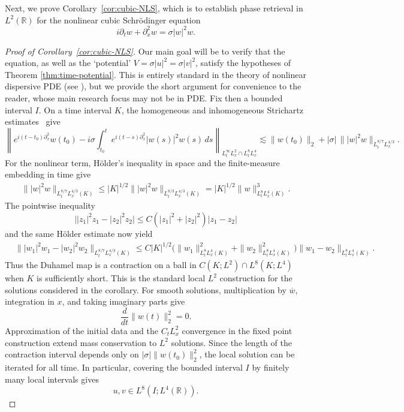 \documentclass[11pt]{amsart}
\theoremstyle{remark}
\newcommand{\R}{\mathbb R}
\newcommand{\1}{\mathbf 1}
\begin{document}
Next, we prove Corollary~\ref{cor:cubic-NLS}, which is to establish phase retrieval in $L^2(\mathbb{R})$ for the nonlinear cubic Schr\"odinger equation 
\[
 i\partial_t w+\partial_x^2w=\sigma|w|^2w.
 \tag{2.1}\label{eq:cubic-NLS}
\]
\begin{proof}[Proof of Corollary~\ref{cor:cubic-NLS}]
Our main goal will be to verify that the equation, as well as the `potential' $V = \sigma|u|^2 = \sigma|v|^2$, satisfy the hypotheses of Theorem \ref{thm:time-potential}. This is entirely standard in the theory of nonlinear dispersive PDE (see \cite{Tao2006}), but we provide the short argument for convenience to the reader, whose main research focus may not be in PDE. Fix then a bounded interval $I$. On a time interval $K$, the homogeneous and
inhomogeneous Strichartz estimates~\cite{KeelTao} give
\[
 \left\|e^{i(t-t_0)\partial_x^2}w(t_0)
 -i\sigma\int_{t_0}^te^{i(t-s)\partial_x^2}|w(s)|^2w(s)\,ds
 \right\|_{L^\infty_tL^2_x\cap L^8_tL^4_x}
 \lesssim \|w(t_0)\|_2
 +|\sigma|\,\||w|^2w\|_{L^{8/7}_tL^{4/3}_x}.
\]
For the nonlinear term, H\"older's inequality in space and the finite-measure
embedding in time give
\begin{align*}
 \||w|^2w\|_{L^{8/7}_tL^{4/3}_x(K)}\le |K|^{1/2}
       \||w|^2w\|_{L^{8/3}_tL^{4/3}_x(K)}=|K|^{1/2}\|w\|_{L^8_tL^4_x(K)}^3.
 \tag{2.2}\label{eq:NLS-fixed-point-estimate}
\end{align*}
The pointwise inequality
\[
 \bigl||z_1|^2z_1-|z_2|^2z_2\bigr|
 \le C(|z_1|^2+|z_2|^2)|z_1-z_2|
\]
and the same H\"older estimate now yield
\begin{align*}
 &\||w_1|^2w_1-|w_2|^2w_2\|_{L^{8/7}_tL^{4/3}_x(K)}\le C|K|^{1/2}
 \bigl(\|w_1\|_{L^8_tL^4_x(K)}^2+\|w_2\|_{L^8_tL^4_x(K)}^2\bigr)
 \|w_1-w_2\|_{L^8_tL^4_x(K)}.
\end{align*}
Thus the Duhamel map is a contraction on a ball in
$C(K;L^2)\cap L^8(K;L^4)$ when $K$ is sufficiently short.  This is the standard local
$L^2$ construction for the solutions considered in the corollary.  For smooth solutions,
multiplication by $\overline w$, integration in $x$, and taking imaginary
parts give
\[
 \frac d{dt}\|w(t)\|_2^2=0.
\]
Approximation of the initial data and the $C_tL^2_x$ convergence in the fixed
point construction extend mass conservation to $L^2$ solutions.  Since the
length of the contraction interval depends only on $|\sigma|\|w(t_0)\|_2^2$,
the local solution can be iterated for all time.  In particular, covering the
bounded interval $I$ by finitely many local intervals gives
\[
 u,v\in L^8(I;L^4(\R)).
 \tag{2.3}\label{eq:NLS-L8L4}
\]
\end{proof}
\end{document}
